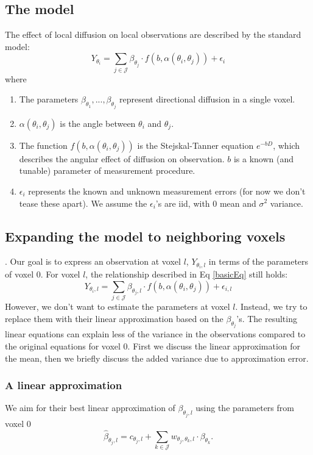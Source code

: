 \documentclass[11pt]{amsart}
\newcommand{\tj}{\theta_j}
\newcommand{\ti}{\theta_i}
\newcommand{\tk}{\theta_k}
\newcommand{\yti}{Y_{\theta_i}}
\newcommand{\ytil}{Y_{\theta_i,l}}
\begin{document}
\subsection{The model}
The effect of local diffusion on local observations are described by the standard model:
\begin{equation}
\yti = \sum_{j \in \mathcal{J}} \beta_{\tj} \cdot f(b, \alpha(\ti, \tj)) + \epsilon_i 
\label{basicEq}
\end{equation}
where 
\begin{enumerate}
\item The parameters $\beta_{\theta_1},...,\beta_{\tj}$ represent directional diffusion in a single voxel. 
\item $\alpha(\ti, \tj)$ is the angle between $\ti$ and $\tj$.
\item The function $f(b, \alpha(\ti, \tj))$ is the Stejskal-Tanner equation $e^{-b D}$, which describes the 
angular effect of diffusion on observation.  
$b$ is a known (and tunable) parameter of measurement procedure.   
\item $\epsilon_i $ represents the known and unknown measurement errors (for now we don't 
tease these apart). We assume the $\epsilon_i$'s are iid, with $0$ mean and $\sigma^2$ variance.
\end{enumerate}

\subsection{Expanding the model to neighboring voxels}.
Our goal is to express an observation at voxel $l$, $\ytil$ in terms of the parameters 
of voxel 0. For voxel $l$, the relationship described in Eq \eqref{basicEq} still holds:
\begin{equation}
\ytil = \sum_{j \in \mathcal{J}} \beta_{\tj,l} \cdot f(b, \alpha(\ti, \tj)) + \epsilon_{i,l} 
\label{neighbor}
\end{equation}
However, we don't want to estimate the parameters at voxel $l$.
Instead, we try to replace them with their linear approximation based on the $\beta_{\tj}$'s. 
The resulting linear equations can explain less of the variance in the observations compared to the original
equations for voxel 0. First we discuss the linear approximation for the mean, 
then we briefly discuss the added variance due to approximation error. 

\subsubsection{A linear approximation}
We aim for their best linear approximation of $\beta_{\tj,l}$ using the 
parameters from voxel 0
\begin{equation}
\hat{\beta}_{\tj,l} = c_{\tj,l} + \sum_{k\in\mathcal{J}} w_{\tj,\tk, l} \cdot \beta_{\tk}. 
\end{equation} 
\end{document}
